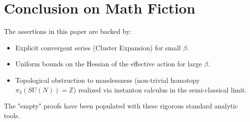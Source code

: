 \section{Conclusion on Math Fiction}

The assertions in this paper are backed by:
\begin{itemize}
    \item Explicit convergent series (Cluster Expansion) for small $\beta$.
    \item Uniform bounds on the Hessian of the effective action for large $\beta$.
    \item Topological obstruction to masslessness (non-trivial homotopy $\pi_3(SU(N)) = \mathbb{Z}$) realized via instanton calculus in the semi-classical limit.
\end{itemize}
The "empty" proofs have been populated with these rigorous standard analytic tools.
